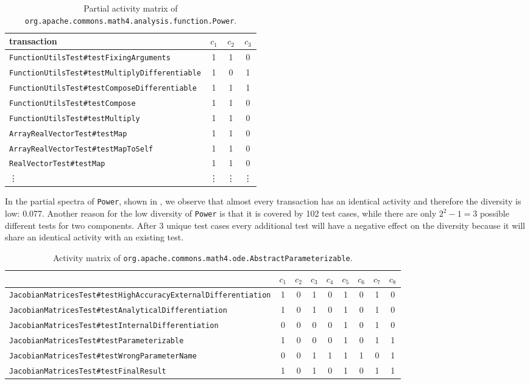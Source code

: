 \documentclass[twoside,a4paper,11pt]{memoir}
\begin{document}
\begin{table}[]
\scriptsize
\centering
\caption{Partial activity matrix of \texttt{org.apache.commons.math4.analysis.function.Power}.}
\label{tab:power}
\begin{tabular}{l|ccc}
transaction & $c_1$ & $c_2$ & $c_3$ \\ \hline
\texttt{FunctionUtilsTest\#testFixingArguments} & 1 & 1 & 0 \\
\texttt{FunctionUtilsTest\#testMultiplyDifferentiable} & 1 & 0 & 1 \\
\texttt{FunctionUtilsTest\#testComposeDifferentiable} & 1 & 1 & 1 \\
\texttt{FunctionUtilsTest\#testCompose} & 1 & 1 & 0 \\
\texttt{FunctionUtilsTest\#testMultiply} & 1 & 1 & 0 \\
\texttt{ArrayRealVectorTest\#testMap} & 1 & 1 & 0 \\
\texttt{ArrayRealVectorTest\#testMapToSelf} & 1 & 1 & 0 \\
\texttt{RealVectorTest\#testMap} & 1 & 1 & 0 \\
\vdots & \vdots & \vdots & \vdots
\end{tabular}
\end{table}

In the partial spectra of \texttt{Power}, shown in , we observe that almost every transaction has an identical activity and therefore the diversity is low: 0.077.
Another reason for the low diversity of \texttt{Power} is that it is covered by 102 test cases, while there are only $2^2 - 1 = 3$ possible different tests for two components.
After 3 unique test cases every additional test will have a negative effect on the diversity because it will share an identical activity with an existing test.

\begin{table}[]
\scriptsize
\centering
\caption{Activity matrix of \texttt{org.apache.commons.math4.ode.AbstractParameterizable}.}
\label{tab:abstractparameter}
\begin{adjustbox}{center}
\begin{tabular}{l|cccccccc}
 & $c_1$ & $c_2$ & $c_3$ & $c_4$ & $c_5$ & $c_6$ & $c_7$ & $c_8$ \\ \hline
\texttt{JacobianMatricesTest\#testHighAccuracyExternalDifferentiation} & 1 & 0 & 1 & 0 & 1 & 0 & 1 & 0 \\
\texttt{JacobianMatricesTest\#testAnalyticalDifferentiation} & 1 & 0 & 1 & 0 & 1 & 0 & 1 & 0 \\
\texttt{JacobianMatricesTest\#testInternalDifferentiation} & 0 & 0 & 0 & 0 & 1 & 0 & 1 & 0 \\
\texttt{JacobianMatricesTest\#testParameterizable} & 1 & 0 & 0 & 0 & 1 & 0 & 1 & 1 \\
\texttt{JacobianMatricesTest\#testWrongParameterName} & 0 & 0 & 1 & 1 & 1 & 1 & 0 & 1 \\
\texttt{JacobianMatricesTest\#testFinalResult} & 1 & 0 & 1 & 0 & 1 & 0 & 1 & 1
\end{tabular}
\end{adjustbox}
\end{table}
\end{document}

